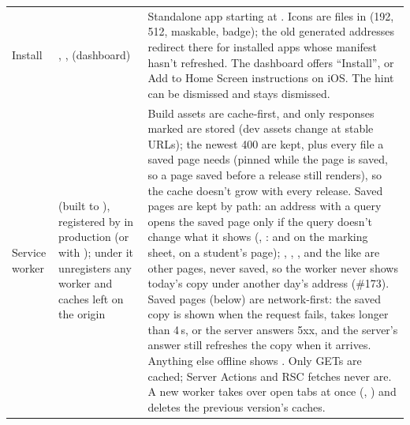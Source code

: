 {\tablefont
\begin{xltabular}{\linewidth}{@{}P{30mm} P{30mm} L@{}}
  \toprule
   &  & \\
  \midrule
  \endhead
  Install & , ,  (dashboard) & Standalone app starting at . Icons are files in  (192, 512, maskable, badge); the old generated  addresses redirect there for installed apps whose manifest hasn't refreshed. The dashboard offers ``Install'', or Add to Home Screen instructions on iOS. The hint can be dismissed and stays dismissed.\\
  Service worker &  (built to ), registered by  in production (or with ); under  it unregisters any worker and  caches left on the origin & Build assets are cache-first, and only responses marked  are stored (dev assets change at stable URLs); the newest 400 are kept, plus every file a saved page needs (pinned while the page is saved, so a page saved before a release still renders), so the cache doesn't grow with every release. Saved pages are kept by path: an address with a query opens the saved page only if the query doesn't change what it shows (, :  and  on the marking sheet,  on a student's page); , , ,  and the like are other pages, never saved, so the worker never shows today's copy under another day's address (\#173). Saved pages (below) are network-first: the saved copy is shown when the request fails, takes longer than 4\,s, or the server answers 5xx, and the server's answer still refreshes the copy when it arrives. Anything else offline shows . Only GETs are cached; Server Actions and RSC fetches never are. A new worker takes over open tabs at once (, ) and deletes the previous version's caches.\\

\end{xltabular}}
